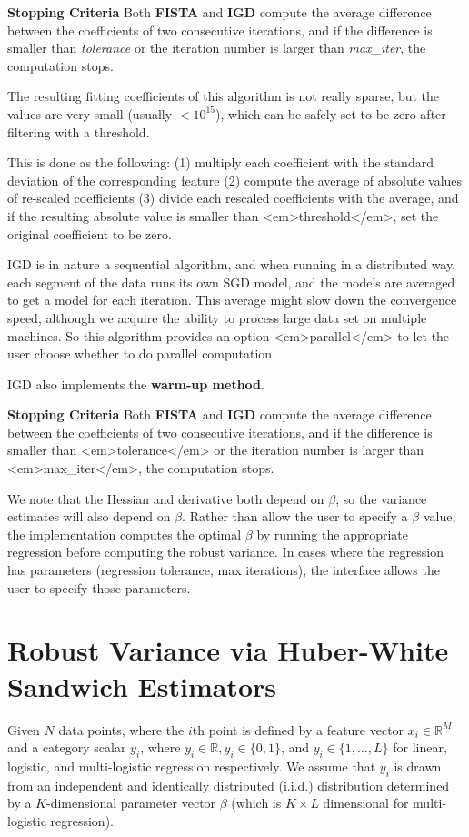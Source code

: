 \textbf{Stopping Criteria} Both \textbf{FISTA} and \textbf{IGD} compute the average difference
between the coefficients of two consecutive iterations, and if the
difference is smaller than \emph{tolerance} or the iteration number
is larger than \emph{max\_iter}, the computation stops.

The resulting fitting coefficients of this algorithm is not really sparse, but
the values are very small (usually $< 10^{15}$), which can be safely set to be
zero after filtering with a threshold.

This is done as the following: (1) multiply each coefficient with the standard
deviation of the corresponding feature (2) compute the average of absolute
values of re-scaled coefficients (3) divide each rescaled coefficients with the
average, and if the resulting absolute value is smaller than <em>threshold</em>,
set the original coefficient to be zero.

IGD is in nature a sequential algorithm, and when running in a distributed way,
each segment of the data runs its own SGD model, and the models are averaged to
get a model for each iteration. This average might slow down the convergence
speed, although we acquire the ability to process large data set on multiple
machines. So this algorithm provides an option <em>parallel</em> to let the user
choose whether to do parallel computation.

IGD also implements the \textbf{warm-up method}.

\textbf{Stopping Criteria} Both \textbf{FISTA} and \textbf{IGD} compute the average
difference between the coefficients of two consecutive iterations, and if the
difference is smaller than <em>tolerance</em> or the iteration number is larger
than <em>max\_iter</em>, the computation stops.


We note that the Hessian and derivative both depend on $\beta$, so the variance estimates will also depend on $\beta$.  Rather than allow the user to specify a $\beta$ value, the implementation computes the optimal $\beta$ by running the appropriate regression  before computing the robust variance.  In cases where the regression has parameters (regression tolerance, max iterations), the interface allows the user to specify those parameters.


\section{Robust Variance via Huber-White Sandwich Estimators}
Given  $N$ data points, where the $i$th point is defined by a feature  vector $x_i \in \mathbb{R}^M$ and a category scalar $y_i$, where $y_i \in \mathbb{R}, y_i \in \{0,1 \}$, and $y_i \in \{1,\dots, L \}$ for linear, logistic, and multi-logistic regression respectively.  We assume that $y_i$ is drawn from an independent and identically distributed (i.i.d.) distribution determined by a $K$-dimensional parameter vector $\beta$ (which is $K\times L$ dimensional for multi-logistic regression).

